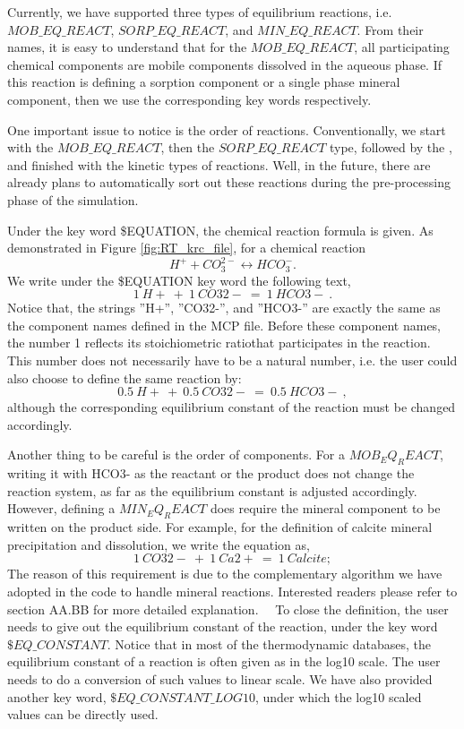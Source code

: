 Currently, we have supported three types of equilibrium reactions, i.e. $MOB\_EQ\_REACT$, $SORP\_EQ\_REACT$, and $MIN\_EQ\_REACT$. From their names, it is easy to understand that for the $MOB\_EQ\_REACT$, all participating chemical components are mobile components dissolved in the aqueous phase. If this reaction is defining a sorption component or a single phase mineral component, then we use the corresponding key words respectively. 

One important issue to notice is the order of reactions. Conventionally, we start with the $MOB\_EQ\_REACT$, then the $SORP\_EQ\_REACT$ type, followed by the , and finished with the kinetic types of reactions. Well, in the future, there are already plans to automatically sort out these reactions during the pre-processing phase of the simulation. 

Under the key word \$EQUATION, the chemical reaction formula is given. As demonstrated in Figure \ref{fig:RT_krc_file}, for a chemical reaction 
$$ H^{+} + CO_3^{2-} \leftrightarrow HCO_3^{-} . $$
We write under the \$EQUATION key word the following text, 
$$ 1 ~ H+ ~ + ~ 1 ~ CO32- ~ = ~ 1 ~ HCO3- ~ . $$
Notice that, the strings ''H+'', ''CO32-'', and ''HCO3-'' are exactly the same as the component names defined in the MCP file. Before these component names, the number 1 reflects its stoichiometric ratiothat participates in the reaction. This number does not necessarily have to be a natural number, i.e. the user could also choose to define the same reaction by: 
$$ 0.5 ~ H+ ~ + ~ 0.5 ~ CO32- ~ = ~ 0.5 ~ HCO3- ~ , $$
although the corresponding equilibrium constant of the reaction must be changed accordingly. 

Another thing to be careful is the order of components. For a $MOB_EQ_REACT$, writing it with HCO3- as the reactant or the product does not change the reaction system, as far as the equilibrium constant is adjusted accordingly. However, defining a $MIN_EQ_REACT$ does require the mineral component to be written on the product side. For example, for the definition of calcite mineral precipitation and dissolution, we write the equation as, 
$$ 1 ~ CO32- ~ + ~ 1 ~ Ca2+ ~ = ~ 1 ~ Calcite; $$
The reason of this requirement is due to the complementary algorithm we have adopted in the code to handle mineral reactions. Interested readers please refer to section AA.BB for more detailed explanation. 
~\
To close the definition, the user needs to give out the equilibrium constant of the reaction, under the key word $\$EQ\_CONSTANT$.  Notice that in most of the thermodynamic databases, the equilibrium constant of a reaction is often given as in the log10 scale. The user needs to do a conversion of such values to linear scale. We have also provided another key word, $\$EQ\_CONSTANT\_LOG10$, under which the log10 scaled values can be directly used. 

